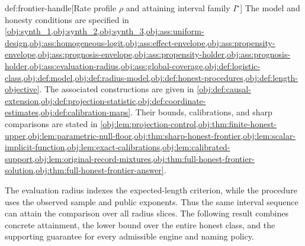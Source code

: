 \begin{definitionv}{def:frontier-handle}[Rate profile $\rho$ and attaining interval family $I^\star$]
The model and honesty conditions are specified in \cref{obj:synth_1,obj:synth_2,obj:synth_3,obj:ass:uniform-design,obj:ass:homogeneous-logit,obj:ass:effect-envelope,obj:ass:propensity-envelope,obj:ass:prognosis-envelope,obj:ass:propensity-holder,obj:ass:prognosis-holder,obj:ass:evaluation-radius,obj:ass:global-coverage,obj:def:logistic-class,obj:def:model,obj:def:radius-model,obj:def:honest-procedures,obj:def:length-objective}. The associated constructions are given in \cref{obj:def:causal-extension,obj:def:projection-statistic,obj:def:coordinate-estimates,obj:def:calibration-maps}. Their bounds, calibrations, and sharp comparisons are stated in \cref{obj:lem:projection-control,obj:thm:finite-honest-upper,obj:lem:parametric-null-floor,obj:thm:sharp-honest-frontier,obj:lem:scalar-implicit-function,obj:lem:exact-calibrations,obj:lem:calibrated-support,obj:lem:original-record-mixtures,obj:thm:full-honest-frontier-solution,obj:thm:full-honest-frontier-answer}.
\end{definitionv}

The evaluation radius indexes the expected-length criterion, while the procedure uses the observed sample and public exponents. Thus the same interval sequence can attain the comparison over all radius slices. The following result combines concrete attainment, the lower bound over the entire honest class, and the supporting guarantee for every admissible engine and naming policy.

